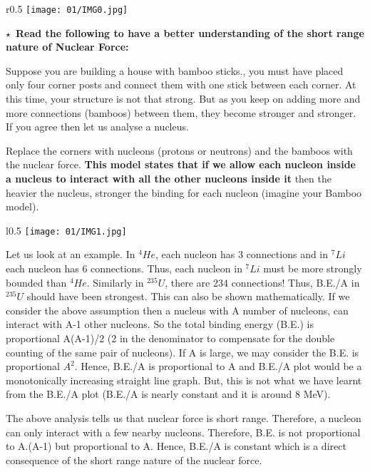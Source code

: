         \begin{wrapfigure}{r}{0.5\textwidth}
        \texttt{[image: 01/IMG0.jpg]}
        \end{wrapfigure}
        
$\star$~{\textbf{Read the following to have a better understanding of the short range nature of Nuclear Force: }}
\par Suppose you are building a house with bamboo sticks., you must have placed only four corner posts and connect them with one stick between each corner. At this time, your structure is not that strong. But as you keep on adding more and more connections (bamboos) between them, they become stronger and stronger. If you agree then let us analyse a nucleus.
 \par Replace the corners with nucleons (protons or neutrons) and the bamboos with the nuclear force.\textbf{ This model states that if we allow each nucleon inside a nucleus to interact with all the other nucleons inside it} then the heavier the nucleus, stronger the binding for each nucleon (imagine your Bamboo model).
         \begin{wrapfigure}{l}{0.5\textwidth}
        \texttt{[image: 01/IMG1.jpg]}
        \end{wrapfigure}
Let us look at an example. In $^{4}He$, each nucleon has 3 connections and in $^{7}Li$ each nucleon has 6 connections. Thus, each nucleon in  $^{7}Li$ must be more strongly bounded than $^{4}He$. Similarly in $^{235}U$, there are 234 connections! Thus, B.E./A in $^{235}U$ should have been strongest. This can also be shown mathematically. If we consider the above assumption then a nucleus with A number of nucleons, can interact with A-1 other nucleons. So the total binding energy (B.E.) is proportional A(A-1)/2 (2 in the denominator to compensate for the double counting of the same pair of nucleons). If A is large, we may consider the B.E. is proportional $A^2$. Hence, B.E./A is proportional to A and B.E./A plot would be a monotonically increasing straight line graph. But, this is not what we have learnt from the B.E./A plot (B.E./A is nearly constant and it is around 8 MeV).

The above analysis tells us that nuclear force is  short range. Therefore, a nucleon can only interact with a few nearby nucleons. Therefore, B.E. is not proportional to A.(A-1) but proportional to A. Hence, B.E./A is constant which is a direct consequence of the short range nature of the nuclear force. 

